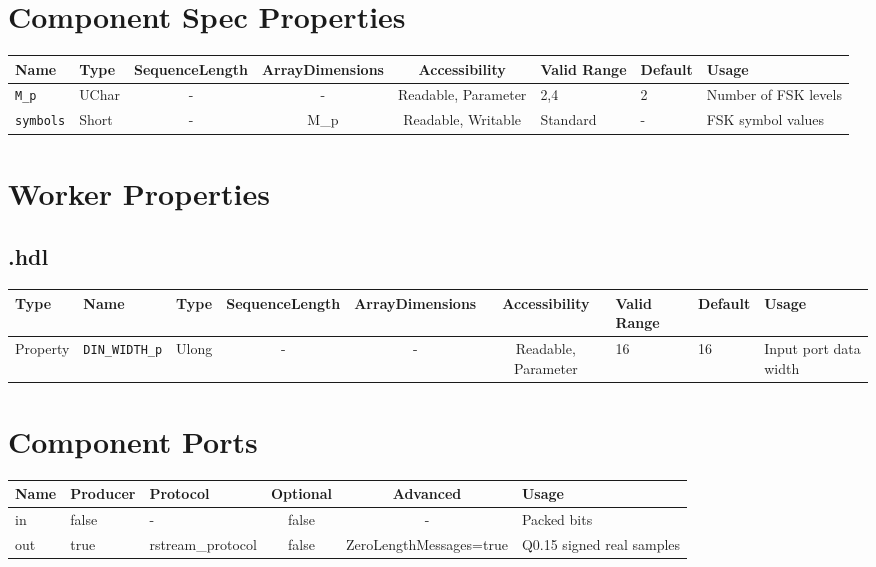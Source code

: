 \begin{landscape}
	\section*{Component Spec Properties}
	\begin{scriptsize}
		\begin{tabular}{|p{2cm}|p{1.5cm}|c|c|c|p{1.5cm}|p{1cm}|p{7cm}|}
			\hline
			\rowcolor{blue}
			Name          	& Type  & SequenceLength & ArrayDimensions & Accessibility       & Valid Range 	& Default & Usage              	\\
			\hline
			\verb+M_p+    	& UChar & -              & -               & Readable, Parameter & 2,4       	& 2       & Number of FSK levels \\
			\hline
			\verb+symbols+  & Short & -              & M\_p            & Readable, Writable	 & Standard    	& -       & FSK symbol values 	\\
			\hline
		\end{tabular}
	\end{scriptsize}

	\section*{Worker Properties}
	\subsection*{\comp.hdl}
	\begin{scriptsize}
		\begin{tabular}{|p{2cm}|p{2cm}|p{1cm}|c|c|c|p{2cm}|p{1cm}|p{4cm}|}
			\hline
			\rowcolor{blue}
			Type     & Name                 & Type  & SequenceLength & ArrayDimensions & Accessibility       & Valid Range 	& Default 	& Usage               	\\
			\hline
			Property & \verb+DIN_WIDTH_p+ 	& Ulong & -              & -               & Readable, Parameter & 16       	& 16     	& Input port data width	\\
			\hline
		\end{tabular}
	\end{scriptsize}

	\section*{Component Ports}
	\begin{scriptsize}
		\begin{tabular}{|M{2cm}|M{1.5cm}|M{4cm}|c|c|p{9cm}|}
			\hline
			\rowcolor{blue}
			Name & Producer & Protocol			& Optional & Advanced 					& Usage      			\\
			\hline
			in   & false    & -					& false    & -        					& Packed bits         	\\
			\hline
			out  & true     & rstream\_protocol & false    & ZeroLengthMessages=true    & Q0.15 signed real samples	\\
			\hline
		\end{tabular}
	\end{scriptsize}

\end{landscape}
